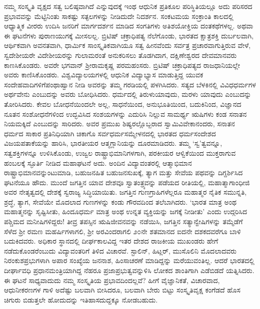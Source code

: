 ನಮ್ಮ ಸಂಸ್ಕೃತಿ ವೃಕ್ಷದ ಸತ್ವ ಬಲಿಷ್ಠವಾಗಿದೆ ಎನ್ನುವುದಕ್ಕೆ ಇಂಥ ಆಧುನಿಕ ಪ್ರತಿಕೂಲ ಪರಿಸ್ಥಿತಿ\-ಯಲ್ಲೂ ಅದು ಪರಿಸರದ ಪ್ರಭಾವವನ್ನು ಮೆಟ್ಟಿನಿಂತು ಸಾಕಷ್ಟು ಸತ್ಫಲಗಳನ್ನು ನೀಡಿದುದೇ ನಿದರ್ಶನ. ಸಂಕಟಮಯ ಸಂಕ್ರಾಂತಿ ಕಾಲದಲ್ಲಿ ಆಧ್ಯಾತ್ಮಿಕ ವೀರರು ಉದಿಸಿ ಜನರಿಗೆ ಮಾರ್ಗ\-ದರ್ಶನ ಮಾಡಿದ ಸಂಗತಿಗಳು ಅತಿಶಯೋಕ್ತಿಯ ದಂತಕಥೆಗಳಲ್ಲ. ಅಥವಾ ಈ ಘಟನೆಗಳು ಪುರಾಣಯುಗಕ್ಕೆ ಮೀಸಲಲ್ಲ. ಬ್ರಿಟಿಷ್ ಚಕ್ರಾಧಿಪತ್ಯ ನೆಲೆಗೊಂಡು, ಭಾರತದ ಕ್ಷಾತ್ರಶಕ್ತಿ ದುರ್ಬಲವಾಗಿ, ಆರ್ಥಿಕವಾಗಿ ಅವನತವಾಗಿ, ಧಾರ್ಮಿಕ ಸಾಂಸ್ಕೃತಿಕವಾಗಿಯೂ ಸತ್ವ ಹೀನವೆಂದು ಸರ್ವತ್ರ ಪ್ರಚಾರವಾಗುತ್ತಿರುವ ವೇಳೆ, ಸ್ವದೇಶೀಯರೇ ವಿದೇಶೀಯರನ್ನು ಗುಲಾಮರಂತೆ ಅನುಕರಿಸಲು ತೊಡಗಿದಾಗ, ದಕ್ಷಿಣೇಶ್ವರದ ದೇವಮಾನವರು ಕಾಣಸಿಕೊಂಡರು. ಅವರೇ ಭಗವಾನ್ ಶ‍್ರೀರಾಮ\-ಕೃಷ್ಣ ಪರಮಹಂಸರು. ಬ್ರಿಟಿಷ್ ಚಕ್ರಾಧಿಪತ್ಯದ ರಾಜಧಾನಿಯಲ್ಲೇ ಅವರು ಕಾಣಿಸಿಕೊಂಡರು. ವಿಶ್ವವಿದ್ಯಾಲಯಗಳಲ್ಲಿ ಆಧುನಿಕ ವಿದ್ಯಾಭ್ಯಾಸ ಮಾಡುತ್ತಿದ್ದ ಯುವಕ ಸಂದೇಹವಾದಿಗಳಿಗೆ\break ಪಂಥಾಹ್ವಾನ ನೀಡಿ ಅವರನ್ನು ತಮ್ಮ ಗರಡಿಯಲ್ಲಿ ಪಳಗಿಸಿದರು. ಸತ್ಯದ ಬೆಳಕಿನಲ್ಲಿ ವಿವಿಧ\break ಧರ್ಮಗಳ ಅರ್ಥವೇನು ಎಂಬುದನ್ನು ಅವರು ಬೋಧಿಸಿದರು. ಧರ್ಮದಲ್ಲಿ ತಿರುಳು\break ಯಾವುದು, ಮರಳು ಯಾವುದು ಎಂಬುದನ್ನು ತೋರಿಸಿದರು. ಕೇವಲ ಬೋಧನೆಯಿಂದಲೇ ಅಲ್ಲ, ಸಾಧನೆಯಿಂದ, ಅನುಭೂತಿಯಿಂದ, ಬದುಕಿನಿಂದ, ವಿಜ್ಞಾನದ ನೂತನ ಸಂಶೋಧನೆಗಳಿಂದ ಉದ್ಭವಿಸಿದ ಸಂಶಯಗಳನ್ನು ಎದುರಿಸಿ ನಿಲ್ಲುವ ಸಾಮರ್ಥ್ಯ ಋಷಿಗಳು ಕಂಡ ಸನಾತನ ನಿಯಮಕ್ಕಿದೆ ಎಂಬುದನ್ನು ಸಾರಿದರು. ಅವರ ಪ್ರಮುಖ ಶಿಷ್ಯರಲ್ಲೊಬ್ಬರಾದ ಸ್ವಾಮಿ\break ವಿವೇಕಾನಂದರು, ಸನಾತನ ಧರ್ಮದ ಸಾಕಾರ ಪ್ರತಿನಿಧಿಯಾಗಿ ಚಿಕಾಗೊ ಸರ್ವಧರ್ಮ\break ಸಮ್ಮೇಳನದಲ್ಲಿ ಭಾರತದ ಧರ್ಮಸಂದೇಶದ ವಿಜಯಪತಾಕೆಯನ್ನು ಹಾರಿಸಿ, ಭಾರತೀಯರ ಆತ್ಮಗ್ಲಾನಿಯನ್ನು ದೂರಮಾಡಿದರು. ತಮ್ಮ ‘ಸ್ವ’ತ್ವವನ್ನೂ, ಸತ್ವಶಕ್ತಿಗಳನ್ನೂ ಉಳಿಸಿಕೊಂಡು, ಉಜ್ವಲ ರಾಷ್ಟ್ರಾಭಿಮಾನಿಗಳಗಾಗಿ, ಪರಕೀಯರ ಆಳ್ವಿಕೆಯಿಂದ ಮುಕ್ತರಾಗುವ ಹಂಬಲಕ್ಕೆ ಸ್ಫೂರ್ತಿ ನೀಡಿದ ಮಹಾಘಟನೆ ಅದು. ಅಂದಿನ ವಿದ್ಯಾವಂತರಲ್ಲಿ ಆತ್ಮಾಭಿಮಾನ ರಾಷ್ಟ್ರಾಭಿಮಾನ\-ವನ್ನುಂಟು\-ಮಾಡಿ, ಬಹುಜನಹಿತ ಬಹುಜನಸುಖಕ್ಕೆ, ತ್ಯಾಗ ಮತ್ತು ಸೇವೆಯ ಪಥವನ್ನು ದಿಗ್ದರ್ಶಿ\-ಸಿದ ಘಟನೆಯೂ ಹೌದು. ಮುಂದೆ ಜಗತ್ತಿನ ಯಾವ ದೇಶವೂ ಸ್ವಾತಂತ್ರ್ಯವನ್ನು ಪಡೆಯದ ರೀತಿಯಲ್ಲಿ, ಮಹಾತ್ಮಾಗಾಂಧೀಜಿ ಅವರ ನೇತೃತ್ವದಲ್ಲಿ ದೇಶಕ್ಕೆ ಸ್ವರಾಜ್ಯ ಸಿದ್ಧಿಯಾಯಿತು. ಜಗತ್ತಿನ ಗುಣಗ್ರಾಹಿಗಳೆಲ್ಲರೂ ಮಹಾತ್ಮರ ನೈತಿಕ ಸಮುನ್ನತಿ, ಶ್ರದ್ಧೆ, ತ್ಯಾಗ, ಸೇವೆಯೇ ಮೊದಲಾದ ಗುಣಗಳನ್ನು ಕಂಡು ಗೌರವದಿಂದ ತಲೆಬಾಗಿದರು. ‘ಭಾರತ ಮಾತ್ರ ಅಂಥ ಮಹಾತ್ಮನನ್ನು ಸೃಷ್ಟಿಸೀತು, ಹಿಂದೂಧರ್ಮ ಮಾತ್ರ ಅಂಥ ಉನ್ನತ ವ್ಯಕ್ತಿಯನ್ನು ಜಗಕ್ಕೆ ನೀಡೀತು’ ಎಂದು ಉದ್ಗರಿಸಿದ ಪಶ್ಚಿಮದ ಮನೀಷಿಗಳಿದ್ದರು! ತೀವ್ರ ತಪಸ್ಸಿನ ಋಷಿಜೀವನವನ್ನು ನಡೆಯಿಸಿ, ಜಗತ್ತಿನ ಸತ್ಯಾನ್ವೇಷಿಗಳನ್ನು ತಮ್ಮೆಡೆಗೆ ಸೆಳೆದ ಶ‍್ರೀ ರಮಣ ಮಹರ್ಷಿಗಳಾಗಲಿ, ಶ‍್ರೀ ಅರವಿಂದರಾಗಲಿ ೨೦ನೇ ಶತಮಾನದ ಐದನೇ ದಶಕದವರೆಗೂ ಬಾಳಿ ಬದುಕಿದವರು. ಅಧಿಕಾರ ಸ್ಥಾನದಲ್ಲಿ ದೀರ್ಘಕಾಲವಿದ್ದ ಇತರ ದೇಶದ ರಾಜಕೀಯ ಮುಖಂಡರು ಹೇಗೆ ನಡೆದು\-ಕೊಂಡ\-\break ರೆಂಬುದು ವಿದ್ಯಾವಂತರಿಗೆ ತಿಳಿದ ವಿಚಾರವೆ. ಸ್ಟಾಲಿನ್, ಹಿಟ್ಲರ್, ಮುಸೊಲಿನಿ ಮೊದಲಾದವರು ನಿರಂಕುಶಪ್ರಭುಗಳಾಗಿ ಅಪಾರ ಸಂಖ್ಯೆಯ ಜನನಾಶ, ಹಿಂಸಾಚರಣೆ ಮಾಡಿದ್ದನ್ನು ಮರೆಯು\-ವಂತಿಲ್ಲ. ಆದರೆ ಭಾರತದಲ್ಲಿ ದೀರ್ಘಾವಧಿ ಪ್ರಧಾನಮಂತ್ರಿಯಾಗಿದ್ದ ನೆಹರೂ ಪ್ರಜಾಪ್ರಭುತ್ವ\-ವನ್ನುಳಿಸಿ ಲೋಕದ ಶಾಂತಿಗಾಗಿ ಎಡೆಬಿಡದೆ ಯತ್ನಿಸಿದರು. ಈ ಘಟನೆ ಸಾಧ್ಯವಾದುದು ನಮ್ಮ ಸಂಸ್ಕೃತಿಯ ಪ್ರಭಾವದಿಂದಲ್ಲವೆ? ಹೀಗೆ ವೈಜ್ಞಾನಿಕತೆ, ವಿಚಾರವಾದ, ಆಧುನೀಕರಣಗಳ ಗಾಳಿ ಅದೆಷ್ಟು ಬಲವಾಗಿ ಬೀಸಿದರೂ, ಬಲವಾಗಿ ಬೇರು ಬಿಟ್ಟು ಸಂಸ್ಕೃತಿವೃಕ್ಷ ಕಂಗೆಡದೆ ಹೊಸ ಚಿಗುರು ಬಿಡುತ್ತಲೇ ಹೋದುದನ್ನು ಇತಿಹಾಸದುದ್ದಕ್ಕೂ ನೋಡಬಹುದು.

